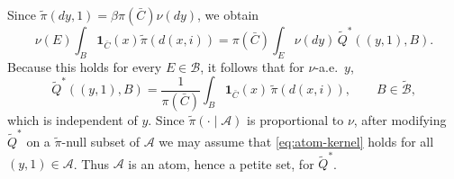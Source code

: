 \documentclass[mnsc,nonblindrev]{informs3}
\begin{document}
Since \(\widetilde\pi(dy,1)=\beta\pi(\bar C)\nu(dy)\), we obtain
\[
\nu(E)\int_B \mathbf 1_{\bar C}(x)\widetilde\pi(d(x,i))
=
\pi(\bar C)\int_E \nu(dy)\,\widetilde Q^\ast((y,1),B).
\]
Because this holds for every \(E\in\mathcal B\), it follows that for
\(\nu\)-a.e.\ \(y\),
\begin{equation}\label{eq:atom-kernel}
\widetilde Q^\ast((y,1),B)
=
\frac{1}{\pi(\bar C)}\int_B \mathbf 1_{\bar C}(x)\,\widetilde\pi(d(x,i)),
\qquad B\in\widetilde{\mathcal B},
\end{equation}
which is independent of \(y\). Since \(\widetilde\pi(\cdot\mid \mathcal A)\) is
proportional to \(\nu\), after modifying \(\widetilde Q^\ast\) on a
\(\widetilde\pi\)-null subset of \(\mathcal A\) we may assume that
\eqref{eq:atom-kernel} holds for all \((y,1)\in\mathcal A\). Thus \(\mathcal A\)
is an atom, hence a petite set, for \(\widetilde Q^\ast\).
\end{document}
